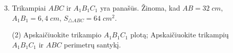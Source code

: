 \documentclass[a4paper]{article}
\begin{document}
\begin{enumerate}
      \setcounter{enumi}{2} %
      \item Trikampiai $ABC$ ir $A_1B_1C_1$ yra panašūs. Žinoma, kad $AB=32 \; cm$,
            $A_1B_1=6,4 \; cm$, $S_{\triangle ABC}=64 \; cm^2$.
            \begin{tasks}[item-format={\normalfont}, after-item-skip=2mm](2)
                  \task Apskaičiuokite trikampio $A_1B_1C_1$ plotą;
                  \task Apskaičiuokite trikampių $A_1B_1C_1$ ir $ABC$ perimetrų santykį.
            \end{tasks}
\end{enumerate}
\end{document}
